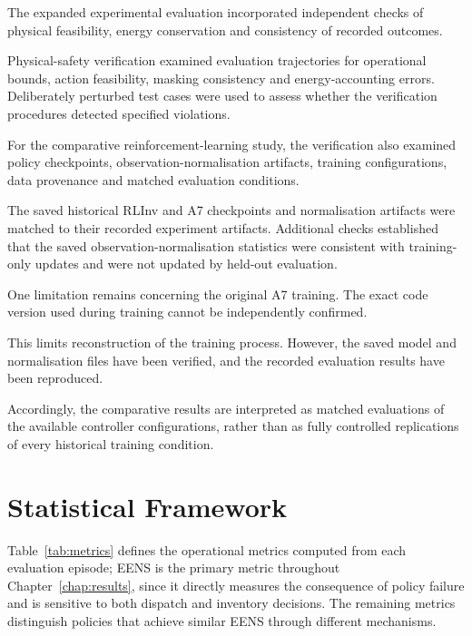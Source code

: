 \begin{revisedblock}
The expanded experimental evaluation incorporated
independent checks of physical feasibility, energy
conservation and consistency of recorded outcomes.

Physical-safety verification examined evaluation
trajectories for operational bounds, action
feasibility, masking consistency and energy-accounting
errors. Deliberately perturbed test cases were used
to assess whether the verification procedures detected
specified violations.

For the comparative reinforcement-learning study,
the verification also examined policy checkpoints,
observation-normalisation artifacts, training
configurations, data provenance and matched
evaluation conditions.

The saved historical RLInv and A7 checkpoints and
normalisation artifacts were matched to their
recorded experiment artifacts. Additional checks
established that the saved observation-normalisation
statistics were consistent with training-only
updates and were not updated by held-out evaluation.

One limitation remains concerning the original
A7 training. The exact code version used during
training cannot be independently confirmed.

This limits reconstruction of the training process.
However, the saved model and normalisation files
have been verified, and the recorded evaluation
results have been reproduced.

Accordingly, the comparative results are interpreted
as matched evaluations of the available controller
configurations, rather than as fully controlled
replications of every historical training condition.
\end{revisedblock}


\section{Statistical Framework}
\label{sec:metrics}

Table~\ref{tab:metrics} defines the operational metrics computed from
each evaluation episode; EENS is the primary metric throughout
Chapter~\ref{chap:results}, since it directly measures the consequence
of policy failure and is sensitive to both dispatch and inventory
decisions. The remaining metrics distinguish policies that achieve
similar EENS through different mechanisms.

